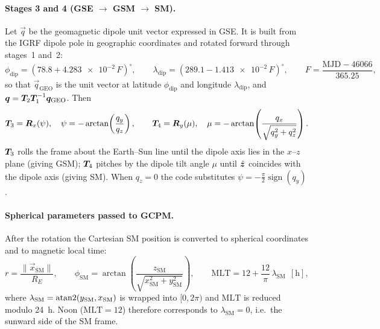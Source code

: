 \paragraph{Stages 3 and 4 (GSE $\to$ GSM $\to$ SM).}  Let $\vec{q}$ be the
geomagnetic dipole unit vector expressed in GSE.  It is built from the IGRF
dipole pole in geographic coordinates and rotated forward through stages~1
and~2:
%
\begin{equation}
  \label{eq:iono-dipole}
  \phi_\mathrm{dip} = \left(78.8 + \num{4.283e-2}\,F\right)^{\circ},
  \qquad
  \lambda_\mathrm{dip} = \left(289.1 - \num{1.413e-2}\,F\right)^{\circ},
  \qquad
  F = \frac{\mathrm{MJD} - 46066}{365.25} ,
\end{equation}
%
so that $\vec{q}_\mathrm{GEO}$ is the unit vector at latitude
$\phi_\mathrm{dip}$ and longitude $\lambda_\mathrm{dip}$, and
$\bm{q} = \bm{T}_2\bm{T}_1^{-1}\bm{q}_\mathrm{GEO}$.  Then
%
\begin{equation}
  \label{eq:iono-t3t4}
  \bm{T}_3 = \bm{R}_x(\psi), \quad \psi = -\arctan\!\left(\frac{q_y}{q_z}\right),
  \qquad
  \bm{T}_4 = \bm{R}_y(\mu), \quad
  \mu = -\arctan\!\left(\frac{q_x}{\sqrt{q_y^2+q_z^2}}\right) .
\end{equation}
%
$\bm{T}_3$ rolls the frame about the Earth--Sun line until the dipole axis lies
in the $x$--$z$ plane (giving GSM); $\bm{T}_4$ pitches by the dipole tilt angle
$\mu$ until $\hat{\bm{z}}$ coincides with the dipole axis (giving SM).  When $q_z=0$
the code substitutes $\psi = -\tfrac{\pi}{2}\operatorname{sign}(q_y)$.

\paragraph{Spherical parameters passed to GCPM.}  After the rotation the
Cartesian SM position is converted to spherical coordinates and to magnetic
local time:
%
\begin{equation}
  \label{eq:iono-mlt}
  r = \frac{\lVert\vec{x}_\mathrm{SM}\rVert}{R_E},
  \qquad
  \phi_\mathrm{SM} = \arctan\!\left(\frac{z_\mathrm{SM}}{\sqrt{x_\mathrm{SM}^2 + y_\mathrm{SM}^2}}\right),
  \qquad
  \mathrm{MLT} = 12 + \frac{12}{\pi}\,\lambda_\mathrm{SM}\ \ [\mathrm{h}],
\end{equation}
%
where $\lambda_\mathrm{SM} = \operatorname{atan2}(y_\mathrm{SM}, x_\mathrm{SM})$ is wrapped
into $[0,2\pi)$ and $\mathrm{MLT}$ is reduced modulo \SI{24}{\hour}.  Noon
($\mathrm{MLT}=12$) therefore corresponds to $\lambda_\mathrm{SM}=0$, i.e.\ the
sunward side of the SM frame.

